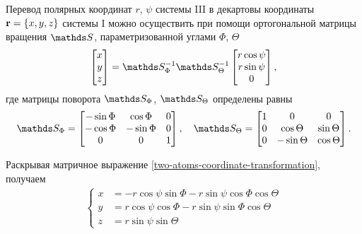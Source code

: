 Перевод полярных координат $r$, $\psi$ системы III в декартовы координаты $\mathbf{r} = \left\{ x, y, z \right\}$ системы I можно осуществить при помощи ортогональной матрицы вращения $\bbS$, параметризованной углами $\Phi$, $\Theta$ \cite{goldstein} 
\begin{gather}
    \begin{bmatrix}
        x \\ y \\ z
    \end{bmatrix} = \bbS_\Phi^{-1} \bbS_\Theta^{-1} 
    \begin{bmatrix}
        r \cos \psi \\ r \sin \psi \\ 0
    \end{bmatrix}, \label{two-atoms-coordinate-transformation}
\end{gather}
% 
где матрицы поворота $\bbS_\Phi$, $\bbS_\Theta$ определены равны
\begin{gather}
    \bbS_\Phi = 
    \begin{bmatrix}
       -\sin \Phi & \cos \Phi & 0 \\
       -\cos \Phi & -\sin \Phi & 0 \\
      0 & 0 & 1
    \end{bmatrix}, \quad
    \bbS_\Theta = 
    \begin{bmatrix}
        1 & 0 & 0 \\
        0 & \cos \Theta & \sin \Theta \\
        0 & -\sin \Theta & \cos \Theta
    \end{bmatrix}.
\end{gather}

Раскрывая матричное выражение \eqref{two-atoms-coordinate-transformation}, получаем 
\begin{gather}
    \left\{
        \begin{aligned}
            x &= -r \cos \psi \sin \Phi - r \sin \psi \cos \Phi \cos \Theta \\
            y &= r \cos \psi \cos \Phi - r \sin \psi \sin \Phi \cos \Theta \\
            z &= r \sin \psi \sin \Theta
        \end{aligned}
    \right. \label{two-atoms-coordinates-transformation2}
\end{gather}


